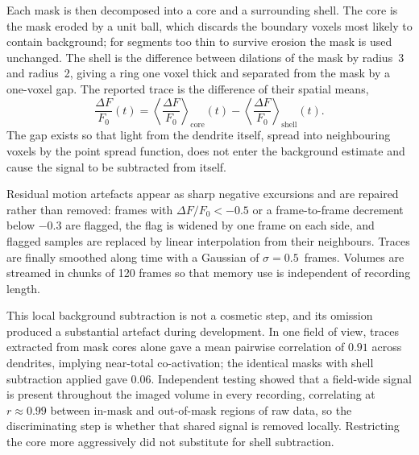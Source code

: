 			Each mask is then decomposed into a core and a surrounding shell.
			The core is the mask eroded by a unit ball, which discards the
			boundary voxels most likely to contain background; for segments too
			thin to survive erosion the mask is used unchanged.
			The shell is the difference between dilations of the mask by radius~3
			and radius~2, giving a ring one voxel thick and separated from the
			mask by a one-voxel gap.
			The reported trace is the difference of their spatial means,
			\begin{equation}\label{equation:methods:m4}
				\frac{\Delta F}{F_0}(t) =
				\left\langle \frac{\Delta F}{F_0} \right\rangle_{\mathrm{core}}(t)
				-
				\left\langle \frac{\Delta F}{F_0} \right\rangle_{\mathrm{shell}}(t).
			\end{equation}
			The gap exists so that light from the dendrite itself, spread into
			neighbouring voxels by the point spread function, does not enter the
			background estimate and cause the signal to be subtracted from
			itself.

			Residual motion artefacts appear as sharp negative excursions and are
			repaired rather than removed: frames with $\Delta F/F_0 < -0.5$ or a
			frame-to-frame decrement below $-0.3$ are flagged, the flag is
			widened by one frame on each side, and flagged samples are replaced
			by linear interpolation from their neighbours.
			Traces are finally smoothed along time with a Gaussian of
			$\sigma = 0.5$~frames.
			Volumes are streamed in chunks of 120 frames so that memory use is
			independent of recording length.

			This local background subtraction is not a cosmetic step, and its
			omission produced a substantial artefact during development.
			In one field of view, traces extracted from mask cores alone gave a
			mean pairwise correlation of $0.91$ across dendrites, implying
			near-total co-activation; the identical masks with shell subtraction
			applied gave $0.06$.
			Independent testing showed that a field-wide signal is present
			throughout the imaged volume in every recording, correlating at
			$r \approx 0.99$ between in-mask and out-of-mask regions of raw data,
			so the discriminating step is whether that shared signal is removed
			locally. Restricting the core more aggressively did not substitute
			for shell subtraction.


